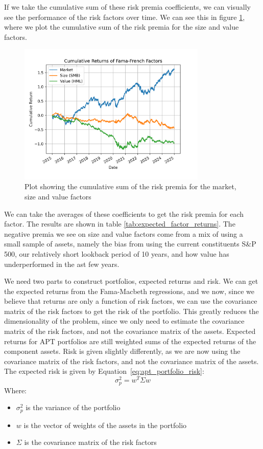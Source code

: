 If we take the cumulative sum of these risk premia coefficients, we can visually see the performance of the risk factors over time.
We can see this in figure \ref{fig:factor_returns}, where we plot the cumulative sum of the risk premia for the size and value factors.
\begin{figure}
    \centering
    \includegraphics[width=0.8\textwidth]{../figs/factor_returns.png}
    \caption{Plot showing the cumulative sum of the risk premia for the market, size and value factors}
    \label{fig:factor_returns}
\end{figure}

We can take the averages of these coefficients to get the risk premia for each factor. The results are shown in table \ref{tab:expected_factor_returns}.
The negative premia we see on size and value factors come from a mix of using a small sample of assets, namely the bias from using the current constituents S\&P 500, our relatively short
lookback period of 10 years, and how value has underperformed in the ast few years.

We need two parts to construct portfolios, expected returns and risk.
We can get the expected returns from the Fama-Macbeth regressions, and we now, since we 
believe that returns are only a function of risk factors, we can use the covariance matrix of the risk factors to get the risk of the portfolio.
This greatly reduces the dimensionality of the problem, since we only need to estimate the covariance matrix of the risk factors, and not the covariance matrix of the assets.
Expected returns for APT portfolios are still weighted sums of the expected returns of the component assets. Risk is given slightly differently, as we are now using the covariance matrix of the risk factors, and not the covariance matrix of the assets.
The expected risk is given by Equation~{\ref{eq:apt_portfolio_risk}}:
\begin{equation}
    \label{eq:apt_portfolio_risk}
    \sigma_p^2 = w^T \Sigma w
\end{equation}
Where:
\begin{itemize}
    \item $\sigma_p^2$ is the variance of the portfolio
    \item $w$ is the vector of weights of the assets in the portfolio
    \item $\Sigma$ is the covariance matrix of the risk factors
\end{itemize}

